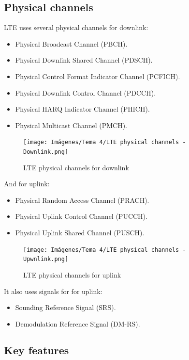 \documentclass[
	12pt,
	twoside
]{book}
\begin{document}
\subsection{Physical channels}

LTE uses several physical channels for downlink:
\begin{itemize}
	\item Physical Broadcast Channel (PBCH).
	\item Physical Downlink Shared Channel (PDSCH).
	\item Physical Control Format Indicator Channel (PCFICH).
	\item Physical Downlink Control Channel (PDCCH).
	\item Physical HARQ Indicator Channel (PHICH).
	\item Physical Multicast Channel (PMCH).
\end{itemize}

\begin{figure}[H]
	\centering
	\texttt{[image: Imágenes/Tema 4/LTE physical channels - Downlink.png]}
	\caption{
		\label{fig:unit4_LTE_phys_down}
		LTE physical channels for downlink
	}
\end{figure}

And for uplink:
\begin{itemize}
	\item Physical Random Access Channel (PRACH).
	\item Physical Uplink Control Channel (PUCCH).
	\item Physical Uplink Shared Channel (PUSCH).
\end{itemize}

\begin{figure}[H]
	\centering
	\texttt{[image: Imágenes/Tema 4/LTE physical channels - Upwnlink.png]}
	\caption{
		\label{fig:unit4_LTE_phys_up}
		LTE physical channels for uplink
	}
\end{figure}

It also uses signals for for uplink:
\begin{itemize}
	\item Sounding Reference Signal (SRS).
	\item Demodulation Reference Signal (DM-RS).
\end{itemize}

\subsection{Key features}
\end{document}
